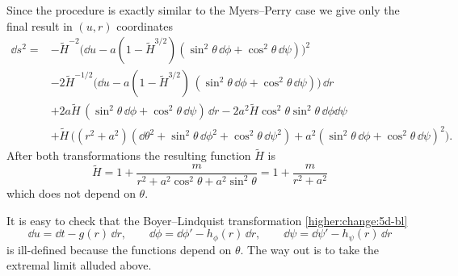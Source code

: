Since the procedure is exactly similar to the Myers--Perry case we give only the final result in $(u, r)$ coordinates
\begin{equation}
	\label{higher-jna:metric:5d-bmpv:ur-before-limit}
	\begin{aligned}
		\dd s^2 = &- \tilde H^{-2} \big(\dd u
				- a (1 - \tilde H^{3/2}) (\sin^2 \theta\, \dd\phi + \cos^2 \theta\, \dd\psi) \big)^2 \\
			&- 2 \tilde H^{-1/2} \big(\dd u - a (1 - \tilde H^{3/2})\, (\sin^2 \theta\, \dd\phi + \cos^2 \theta\, \dd\psi) \big)\, \dd r \\
			&+ 2 a \tilde H\, (\sin^2 \theta\, \dd\phi + \cos^2 \theta\, \dd\psi)\, \dd r
			- 2 a^2 \tilde H \cos^2 \theta \sin^2 \theta\, \dd\phi \dd\psi
			\\
			&+ \tilde H\, \Big(
				(r^2 + a^2) (\dd \theta^2 + \sin^2 \theta\, \dd\phi^2 + \cos^2 \theta\, \dd\psi^2)
				+ a^2 (\sin^2 \theta\, \dd\phi + \cos^2 \theta\, \dd\psi)^2 \Big).
	\end{aligned}
\end{equation} 
After both transformations the resulting function $\tilde H$ is
\begin{equation}
	\label{higher-jna:eq:5d-bmpv:tilde-H}
	\tilde H = 1 + \frac{m}{r^2 + a^2 \cos^2\theta + a^2 \sin^2\theta}
		= 1 + \frac{m}{r^2 + a^2}
\end{equation}
which does not depend on $\theta$.

It is easy to check that the Boyer--Lindquist transformation \eqref{higher:change:5d-bl}
\begin{equation}
	\dd u = \dd t - g(r)\, \dd r, \qquad
	\dd\phi = \dd\phi' - h_\phi(r)\, \dd r, \qquad
	\dd\psi = \dd\psi' - h_\psi(r)\, \dd r
\end{equation} 
is ill-defined because the functions depend on $\theta$.
The way out is to take the extremal limit alluded above.

